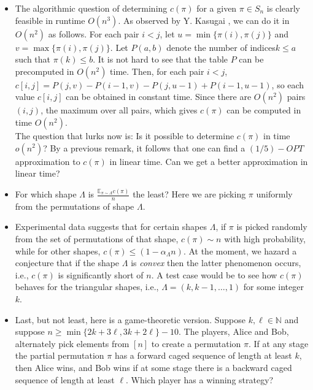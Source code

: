 \documentclass[11pt, a4paper]{article}
\theoremstyle{compact}
\begin{document}
\begin{itemize}
The size of a largest possible, commonly caged subset of $\pi_1$ and $\pi_2$ - a question of natural interest - is likely to be much larger though that is not clear at the moment.
\item The algorithmic question of determining $c(\pi)$ for a given $\pi\in S_n$ is clearly feasible in runtime $O(n^3)$. As observed by Y. Kasugai \cite{Yuuki},  we can do it in $O(n^2)$ as follows. For each pair $i <j$, let $u = \min\{\pi(i), \pi(j)\}$ and $v = \max\{\pi(i), \pi(j)\}$. Let $P(a,b)$ denote the number of indices$k\le a$ such that $\pi(k)\le b$. It is not hard to see that the table $P$ can be precomputed in $O(n^2)$ time. Then, for each pair $i < j$,
$c[i,j] = P(j,v)-P(i-1,v)-P(j,u-1)+P(i-1,u-1)$, so each value $c[i,j]$ can be obtained in constant time. Since there are $O(n^2)$ pairs $(i,j)$, the maximum over all pairs, which gives $c(\pi)$ can be computed in time $O(n^2)$.\\
The question that lurks now is: Is it possible to determine $c(\pi)$ in time $o(n^2)$? By a previous remark, it follows that one can find a $(1/5)-OPT$ approximation to $c(\pi)$ in linear time. Can we get a better approximation in linear time?
\item For which shape $\Lambda$ is $\frac{\mathbb{E}_{\pi\sim\Lambda} c(\pi)}{n}$ the least? Here we are picking $\pi$ uniformly from the permutations of shape $\Lambda$.   
\item Experimental data suggests that for certain shapes $\Lambda$, if $\pi$ is picked randomly from the set of permutations of that shape,  $c(\pi)\sim n$ with high probability, while for other shapes, $c(\pi)\le (1-\alpha_{\Lambda}n)$. At the moment, we hazard a conjecture that if the shape $\Lambda$ is \emph{convex} then the latter phenomenon occurs, i.e., $c(\pi)$ is significantly short of $n$. A test case would be to see how $c(\pi)$ behaves for the triangular shapes, i.e., $\Lambda=(k,k-1,\ldots,1)$ for some integer $k$. 
\item Last, but not least, here is a game-theoretic version. Suppose $k,\ell\in\mathbb{N}$ and suppose $n\ge\min\{2k+3\ell,3k+2\ell\}-10$. The players, Alice and Bob, alternately pick elements from $[n]$ to create a permutation $\pi$. If at any stage the partial permutation $\pi$ has a forward caged sequence of length at least $k$, then Alice wins, and Bob wins if at some stage there is a backward caged sequence of length at least $\ell$. Which player has a winning strategy?
\end{itemize}

   
\end{document}
